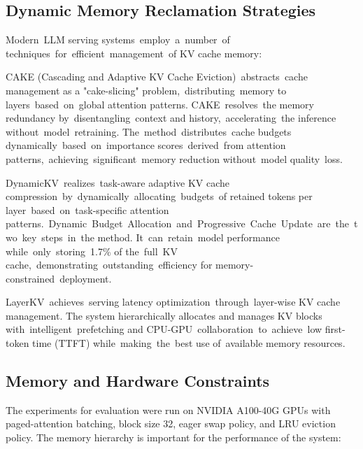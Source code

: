 \documentclass[sigconf,nonacm]{acmart}
\begin{document}
\subsection{Dynamic Memory Reclamation Strategies}
\label{sec:subsection}
Modern LLM serving systems employ a number of techniques for efficient management of KV cache memory:
\par CAKE (Cascading and Adaptive KV Cache Eviction) abstracts cache management as a "cake-slicing" problem, distributing memory to layers based on global attention patterns. CAKE resolves the memory redundancy by disentangling context and history, accelerating the inference without model retraining. The method distributes cache budgets dynamically based on importance scores derived from attention patterns, achieving significant memory reduction without model quality loss.
\par DynamicKV realizes task-aware adaptive KV cache compression by dynamically allocating budgets of retained tokens per layer based on task-specific attention patterns. Dynamic Budget Allocation and Progressive Cache Update are the two key steps in the method. It can retain model performance while only storing 1.7\% of the full KV cache, demonstrating outstanding efficiency for memory-constrained deployment.
\par LayerKV achieves serving latency optimization through layer-wise KV cache management. The system hierarchically allocates and manages KV blocks with intelligent prefetching and CPU-GPU collaboration to achieve low first-token time (TTFT) while making the best use of available memory resources.
\subsection{Memory and Hardware Constraints}
\label{sec:subsection}
The experiments for evaluation were run on NVIDIA A100-40G GPUs with paged-attention batching, block size 32, eager swap policy, and LRU eviction policy. The memory hierarchy is important for the performance of the system:
\end{document}
